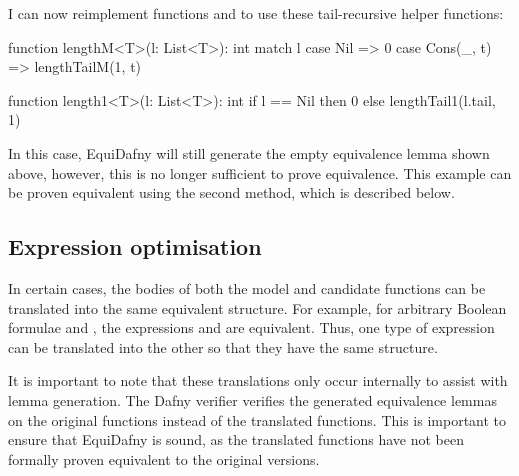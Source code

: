 I can now reimplement functions  and  to use these tail-recursive helper functions:
\begin{dafny}
function lengthM<T>(l: List<T>): int {
    match l {
        case Nil => 0
        case Cons(_, t) => lengthTailM(1, t)
    }
}

function length1<T>(l: List<T>): int {
    if l == Nil then 0 else lengthTail1(l.tail, 1)
}
\end{dafny}
%
In this case, EquiDafny will still generate the empty equivalence lemma shown above, however, this is no longer sufficient to prove equivalence. This example can be proven equivalent using the second method, which is described below. 

\subsection{Expression optimisation}

In certain cases, the bodies of both the model and candidate functions can be translated into the same equivalent structure. For example, for arbitrary Boolean formulae  and , the expressions  and  are equivalent. Thus, one type of expression can be translated into the other so that they have the same structure. 

It is important to note that these translations only occur internally to assist with lemma generation. The Dafny verifier verifies the generated equivalence lemmas on the original functions instead of the translated functions. This is important to ensure that EquiDafny is sound, as the translated functions have not been formally proven equivalent to the original versions.

